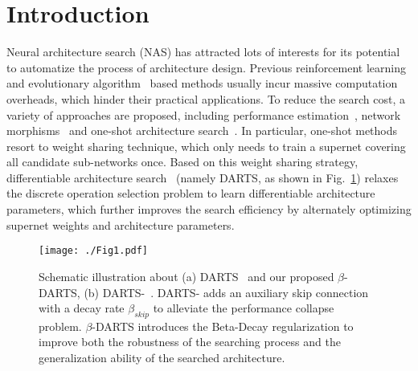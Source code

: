 \documentclass[10pt,twocolumn,letterpaper]{article}
\begin{document}
\section{Introduction} \label{sec:intro}
Neural architecture search (NAS) has attracted lots of interests for its potential to automatize the process of architecture design. Previous reinforcement learning~\cite{nasnet, mnasnet} and evolutionary algorithm~\cite{amoebanet} based methods usually incur massive computation overheads, which hinder their practical applications. To reduce the search cost, a variety of approaches are proposed, including performance estimation~\cite{klein2016learning}, network morphisms~\cite{cai2018path} and one-shot architecture search~\cite{spos,darts}. In particular, one-shot methods resort to weight sharing technique, which only needs to train a supernet covering all candidate sub-networks once. Based on this weight sharing strategy, differentiable architecture search~\cite{darts} (namely DARTS, as shown in Fig.~\ref{fig:1}) relaxes the discrete operation selection problem to learn differentiable architecture parameters, which further improves the search efficiency by alternately optimizing supernet weights and architecture parameters.

  \begin{figure}[t] 
	\centering
\texttt{[image: ./Fig1.pdf]}
\vspace{-12pt}
	\caption{ Schematic illustration about (a) DARTS~\cite{darts} and our proposed $\beta$-DARTS, (b) DARTS-~\cite{darts-}.
	DARTS- adds an auxiliary skip connection with a decay rate $\beta_{skip}$
to alleviate the performance collapse problem. $\beta$-DARTS introduces the Beta-Decay regularization to improve both the robustness of the searching process and the generalization ability of the searched architecture.}
	\label{fig:1}
	\vspace{-12pt}	
\end{figure}
	
\end{document}
